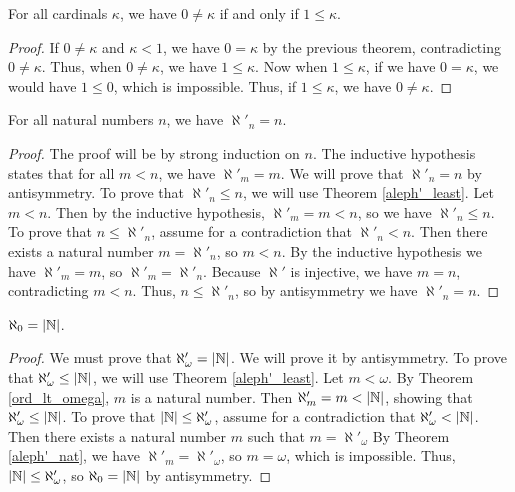 \documentclass[../../math.tex]{subfiles}
\begin{document}
\begin{theorem} \label{card_pos_one}
    For all cardinals $\kappa$, we have $0 \neq \kappa$ if and only if $1 \leq
    \kappa$.
\end{theorem}
\begin{proof}
    If $0 \neq \kappa$ and $\kappa < 1$, we have $0 = \kappa$ by the previous
    theorem, contradicting $0 \neq \kappa$.  Thus, when $0 \neq \kappa$, we have
    $1 \leq \kappa$.  Now when $1 \leq \kappa$, if we have $0 = \kappa$, we
    would have $1 \leq 0$, which is impossible.  Thus, if $1 \leq \kappa$, we
    have $0 \neq \kappa$.
\end{proof}

\begin{theorem} \label{aleph'_nat}
    For all natural numbers $n$, we have $\aleph'_n = n$.
\end{theorem}
\begin{proof}
    The proof will be by strong induction on $n$.  The inductive hypothesis
    states that for all $m < n$, we have $\aleph'_m = m$.  We will prove that
    $\aleph'_n = n$ by antisymmetry.  To prove that $\aleph'_n \leq n$, we will
    use Theorem \ref{aleph'_least}.  Let $m < n$.  Then by the inductive
    hypothesis, $\aleph'_m = m < n$, so we have $\aleph'_n \leq n$.  To prove
    that $n \leq \aleph'_n$, assume for a contradiction that $\aleph'_n < n$.
    Then there exists a natural number $m = \aleph'_n$, so $m < n$.  By the
    inductive hypothesis we have $\aleph'_m = m$, so $\aleph'_m = \aleph'_n$.
    Because $\aleph'$ is injective, we have $m = n$, contradicting $m < n$.
    Thus, $n \leq \aleph'_n$, so by antisymmetry we have $\aleph'_n = n$.
\end{proof}

\begin{theorem} \label{aleph_0}
    $\aleph_0 = |\mathbb{N}|$.
\end{theorem}
\begin{proof}
    We must prove that $\aleph'_\omega = |\mathbb{N}|$.  We will prove it by
    antisymmetry.  To prove that $\aleph'_\omega \leq |\mathbb{N}|$, we will use Theorem
    \ref{aleph'_least}.  Let $m < \omega$.  By Theorem \ref{ord_lt_omega}, $m$
    is a natural number.  Then $\aleph'_m = m < |\mathbb{N}|$, showing that
    $\aleph'_\omega \leq |\mathbb{N}|$.  To prove that $|\mathbb{N}| \leq \aleph'_\omega$,
    assume for a contradiction that $\aleph'_\omega < |\mathbb{N}|$.  Then there exists
    a natural number $m$ such that $m = \aleph'_\omega$  By Theorem
    \ref{aleph'_nat}, we have $\aleph'_m = \aleph'_\omega$, so $m = \omega$,
    which is impossible.  Thus, $|\mathbb{N}| \leq \aleph'_\omega$, so $\aleph_0 = |\mathbb{N}|$
    by antisymmetry.
\end{proof}
\end{document}
